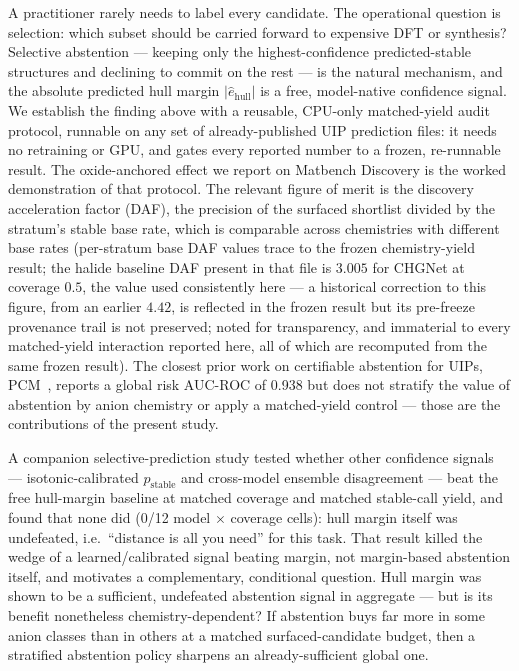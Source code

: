 \documentclass[aip,jcp,preprint,superscriptaddress,amsmath,amssymb]{revtex4-2}
\begin{document}
A practitioner rarely needs to label every candidate. The operational question is
selection: which subset should be carried forward to expensive DFT or synthesis? Selective
abstention --- keeping only the highest-confidence predicted-stable structures and declining
to commit on the rest --- is the natural mechanism, and the absolute predicted hull margin
$|\hat{e}_{\mathrm{hull}}|$ is a free, model-native confidence signal. We establish the finding
above with a reusable, CPU-only matched-yield audit protocol, runnable on any set of
already-published UIP prediction files: it needs no retraining or GPU, and gates every reported
number to a frozen, re-runnable result. The oxide-anchored effect we report on Matbench
Discovery is the worked demonstration of that protocol. The relevant figure of
merit is the discovery acceleration factor (DAF), the precision of the surfaced shortlist
divided by the stratum's stable base rate, which is comparable across chemistries with
different base rates (per-stratum base DAF values trace to the frozen chemistry-yield
result; the halide baseline DAF present in that file is $3.005$ for CHGNet at coverage $0.5$,
the value used consistently here --- a historical correction to this figure, from an earlier
$4.42$, is reflected in the frozen result but its pre-freeze provenance trail is not preserved;
noted for transparency, and immaterial to every matched-yield interaction reported here, all
of which are recomputed from the same frozen result).
The closest prior work on certifiable abstention for UIPs, PCM~\citep{pcm2026}, reports a
global risk AUC-ROC of 0.938 but does not stratify the value of abstention by anion chemistry
or apply a matched-yield control --- those are the contributions of the present study.

A companion selective-prediction study tested whether other confidence signals ---
isotonic-calibrated $p_{\mathrm{stable}}$ and cross-model ensemble disagreement --- beat the
free hull-margin baseline at matched coverage and matched stable-call yield, and found
that none did (0/12 model $\times$ coverage cells): hull margin itself was undefeated, i.e.\
``distance is all you need'' for this task. That result killed the wedge of a
learned/calibrated signal beating margin, not margin-based abstention itself, and motivates a
complementary, conditional question. Hull margin was shown to be a sufficient,
undefeated abstention signal in aggregate --- but is its benefit nonetheless
chemistry-dependent? If abstention buys far more in some anion classes than in
others at a matched surfaced-candidate budget, then a stratified abstention policy sharpens
an already-sufficient global one.
\end{document}
